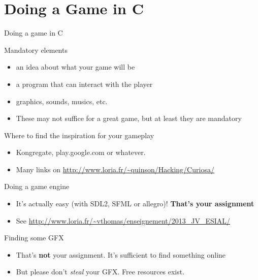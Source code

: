 
\section{Doing a Game in C}\subtoc
\begin{frame}{Doing a game in C}
  \begin{block}{Mandatory elements}
    \begin{itemize}
    \item {} an idea about what your game will be
    \item {} a program that can interact with the player
    \item {} graphics, sounds, musics, etc.
    \item These may not suffice for a great game, but at least they are mandatory
    \end{itemize}
  \end{block}\vspace{-.5\baselineskip}

  \begin{block}{Where to find the inspiration for your gameplay}
    \begin{itemize}
    \item Kongregate, play.google.com or whatever.
    \item Many links on \url{http://www.loria.fr/~quinson/Hacking/Curiosa/}
    \end{itemize}
  \end{block}\vspace{-.5\baselineskip}

  \begin{block}{Doing a game engine}
    \begin{itemize}
    \item It's actually  easy (with SDL2, SFML or allegro)! %
      \textbf{That's your assignment}
    \item See \url{http://www.loria.fr/~vthomas/enseignement/2013_JV_ESIAL/}
    \end{itemize}
  \end{block}\vspace{-.5\baselineskip}

  \begin{block}{Finding some GFX}
    \begin{itemize}
    \item That's \textbf{not} your assignment. It's sufficient to find something online
    \item But please don't \textit{steal} your GFX. Free resources exist.
    \end{itemize}
  \end{block}
\end{frame}

